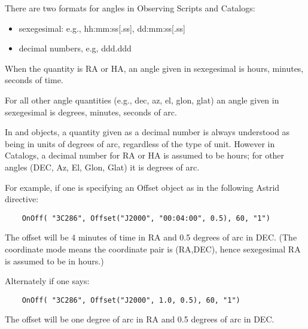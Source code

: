 \label{appendix:angles}


There are two formats for angles in Observing Scripts and Catalogs:

\begin{itemize}
\item sexegesimal: e.g., hh:mm:ss[.ss], dd:mm:ss[.ss]
\item decimal numbers, e.g, ddd.ddd
\end{itemize}

When the quantity is RA or HA, an angle given in sexegesimal is hours, minutes, seconds of time.

For all other angle quantities (e.g., dec, az, el, glon, glat) an angle given in sexegesimal is degrees, minutes, seconds of arc.

In  and  objects, a quantity given as a decimal number is always understood as being in units of degrees of arc, regardless of the type of unit.
However in Catalogs, a decimal number for RA or HA is assumed to be hours; for other angles (DEC, Az, El, Glon, Glat) it is degrees of arc.  

For example, if one is specifying an Offset object as in the following Astrid directive:
\begin{verbatim}
    OnOff( "3C286", Offset("J2000", "00:04:00", 0.5), 60, "1")
\end{verbatim}
The offset will be 4 minutes of time in RA and 0.5 degrees of arc in DEC.
(The coordinate mode  means the coordinate pair is (RA,DEC), hence sexegesimal RA is assumed to be in hours.)

Alternately if one says:
\begin{verbatim}
    OnOff( "3C286", Offset("J2000", 1.0, 0.5), 60, "1")
\end{verbatim}
The offset will be one degree of arc in RA and 0.5 degrees of arc in DEC.

\newpage


